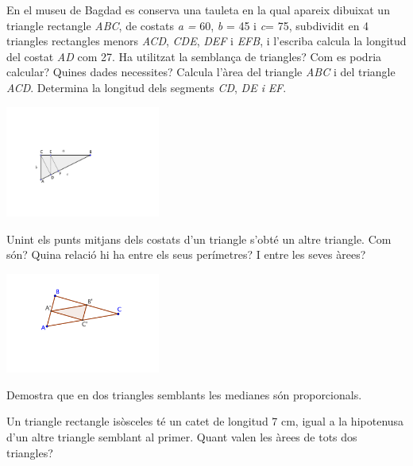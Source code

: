 \begin{activitats}
\begin{mylist}
\exer 
	En el museu de Bagdad es conserva una tauleta en la qual apareix dibuixat un triangle rectangle \textit{ABC}, de costats \textit{a =} 60, \textit{b} = 45 i \textit{c}= 75, subdividit en 4 triangles rectangles menors \textit{ACD}, \textit{CDE}, \textit{DEF} i \textit{EFB}, i l'escriba calcula la longitud del costat \textit{AD} com 27. Ha utilitzat la semblança de triangles? Com es podria calcular? Quines dades necessites? Calcula l'àrea del triangle \textit{ABC} i del triangle \textit{ACD}. Determina la longitud dels segments \textit{CD}, \textit{DE i}  \textit{EF}. 
 
\begin{center}
	\includegraphics[width=0.38\textwidth]{img-09/fig17}
\end{center}
 
 
 \exer  Unint els punts mitjans dels costats d'un triangle s'obté un altre triangle. Com són? Quina relació hi ha entre els seus perímetres? I entre les seves àrees?
 
 \begin{center}
 	\includegraphics[width=0.38\textwidth]{img-09/fig20}
 \end{center}


\exer  Demostra que en dos triangles semblants les medianes són proporcionals. 


\exer  Un triangle rectangle isòsceles té un catet de longitud 7 cm, igual a la hipotenusa d'un altre triangle semblant al primer. Quant valen les àrees de tots dos triangles?


\end{mylist}
\end{activitats}
